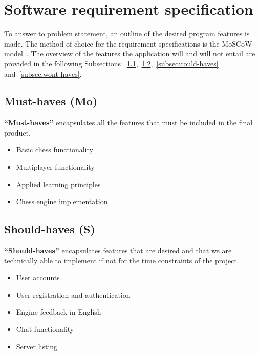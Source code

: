 \section{Software requirement specification}\label{sec:software-requirement-specification}

To answer to problem statement, an outline of the desired program features is made.
The method of choice for the requirement specifications is the MoSCoW model~\cite{hudaib2018}.
The overview of the features the application will and will not entail are provided in the following Subsections
~\ref{subsec:must-haves},~\ref{subsec:should-haves},~\ref{subsec:could-haves} and~\ref{subsec:wont-haves}.

\subsection{Must-haves (Mo)}\label{subsec:must-haves}

\textbf{``Must-haves''} encapsulates all the features that must be
included in the final product.

\begin{itemize}
    \item Basic chess functionality
    \item Multiplayer functionality
    \item Applied learning principles
    \item Chess engine implementation
\end{itemize}

\subsection{Should-haves (S)}\label{subsec:should-haves}

\textbf{``Should-haves''} encapsulates features that are desired and that we are technically able to implement if not
for the time constraints of the project.

\begin{itemize}
    \item User accounts
    \item User registration and authentication
    \item Engine feedback in English
    \item Chat functionality
    \item Server listing
\end{itemize}

